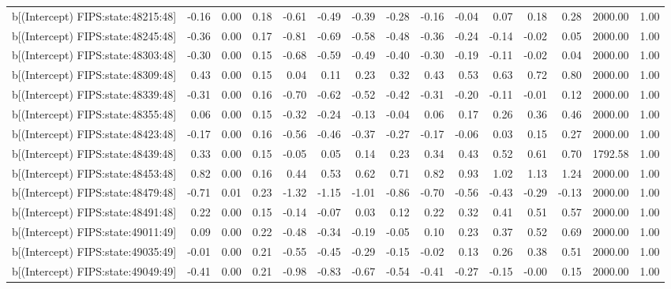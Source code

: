 \begin{table}[ht]
\begin{tabular}{rrrrrrrrrrrrrrr}
  b[(Intercept) FIPS:state:48215:48] & -0.16 & 0.00 & 0.18 & -0.61 & -0.49 & -0.39 & -0.28 & -0.16 & -0.04 & 0.07 & 0.18 & 0.28 & 2000.00 & 1.00 \\ 
  b[(Intercept) FIPS:state:48245:48] & -0.36 & 0.00 & 0.17 & -0.81 & -0.69 & -0.58 & -0.48 & -0.36 & -0.24 & -0.14 & -0.02 & 0.05 & 2000.00 & 1.00 \\ 
  b[(Intercept) FIPS:state:48303:48] & -0.30 & 0.00 & 0.15 & -0.68 & -0.59 & -0.49 & -0.40 & -0.30 & -0.19 & -0.11 & -0.02 & 0.04 & 2000.00 & 1.00 \\ 
  b[(Intercept) FIPS:state:48309:48] & 0.43 & 0.00 & 0.15 & 0.04 & 0.11 & 0.23 & 0.32 & 0.43 & 0.53 & 0.63 & 0.72 & 0.80 & 2000.00 & 1.00 \\ 
  b[(Intercept) FIPS:state:48339:48] & -0.31 & 0.00 & 0.16 & -0.70 & -0.62 & -0.52 & -0.42 & -0.31 & -0.20 & -0.11 & -0.01 & 0.12 & 2000.00 & 1.00 \\ 
  b[(Intercept) FIPS:state:48355:48] & 0.06 & 0.00 & 0.15 & -0.32 & -0.24 & -0.13 & -0.04 & 0.06 & 0.17 & 0.26 & 0.36 & 0.46 & 2000.00 & 1.00 \\ 
  b[(Intercept) FIPS:state:48423:48] & -0.17 & 0.00 & 0.16 & -0.56 & -0.46 & -0.37 & -0.27 & -0.17 & -0.06 & 0.03 & 0.15 & 0.27 & 2000.00 & 1.00 \\ 
  b[(Intercept) FIPS:state:48439:48] & 0.33 & 0.00 & 0.15 & -0.05 & 0.05 & 0.14 & 0.23 & 0.34 & 0.43 & 0.52 & 0.61 & 0.70 & 1792.58 & 1.00 \\ 
  b[(Intercept) FIPS:state:48453:48] & 0.82 & 0.00 & 0.16 & 0.44 & 0.53 & 0.62 & 0.71 & 0.82 & 0.93 & 1.02 & 1.13 & 1.24 & 2000.00 & 1.00 \\ 
  b[(Intercept) FIPS:state:48479:48] & -0.71 & 0.01 & 0.23 & -1.32 & -1.15 & -1.01 & -0.86 & -0.70 & -0.56 & -0.43 & -0.29 & -0.13 & 2000.00 & 1.00 \\ 
  b[(Intercept) FIPS:state:48491:48] & 0.22 & 0.00 & 0.15 & -0.14 & -0.07 & 0.03 & 0.12 & 0.22 & 0.32 & 0.41 & 0.51 & 0.57 & 2000.00 & 1.00 \\ 
  b[(Intercept) FIPS:state:49011:49] & 0.09 & 0.00 & 0.22 & -0.48 & -0.34 & -0.19 & -0.05 & 0.10 & 0.23 & 0.37 & 0.52 & 0.69 & 2000.00 & 1.00 \\ 
  b[(Intercept) FIPS:state:49035:49] & -0.01 & 0.00 & 0.21 & -0.55 & -0.45 & -0.29 & -0.15 & -0.02 & 0.13 & 0.26 & 0.38 & 0.51 & 2000.00 & 1.00 \\ 
  b[(Intercept) FIPS:state:49049:49] & -0.41 & 0.00 & 0.21 & -0.98 & -0.83 & -0.67 & -0.54 & -0.41 & -0.27 & -0.15 & -0.00 & 0.15 & 2000.00 & 1.00 \\ 

\end{tabular}
\end{table}
